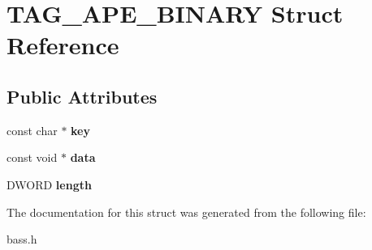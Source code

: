 \section{T\+A\+G\+\_\+\+A\+P\+E\+\_\+\+B\+I\+N\+A\+R\+Y Struct Reference}
\label{struct_t_a_g___a_p_e___b_i_n_a_r_y}
\subsection*{Public Attributes}
\begin{DoxyCompactItemize}
\item 
const char $\ast$ {\bfseries key}\label{struct_t_a_g___a_p_e___b_i_n_a_r_y_a2bb8b34beb262c21c79fe9b3dd935e6e}

\item 
const void $\ast$ {\bfseries data}\label{struct_t_a_g___a_p_e___b_i_n_a_r_y_a5ce86f75cb101a224885cb6d083e717a}

\item 
D\+W\+O\+R\+D {\bfseries length}\label{struct_t_a_g___a_p_e___b_i_n_a_r_y_a7e3623a188e60d152fb9cdcd7a8f9668}

\end{DoxyCompactItemize}


The documentation for this struct was generated from the following file\+:\begin{DoxyCompactItemize}
\item 
bass.\+h\end{DoxyCompactItemize}
